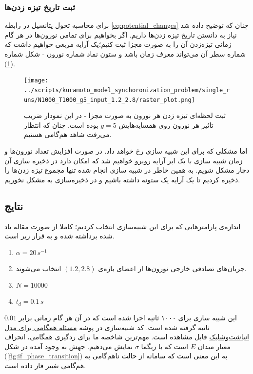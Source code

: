 \documentclass[12pt,onecolumn,a4paper]{article}
\begin{document}
\subsubsection{ثبت تاریخ تیزه زدن‌ها}
برای محاسبه تحول پتانسیل در رابطه \ref{eq:potential_changes} چنان که توضیح داده شد نیاز به دانستن تاریخ تیزه زدن‌ها داریم. اگر بخواهیم برای تمامی نورون‌ها در هر گام زمانی تیزه‌زدن آن را به صورت مجزا ثبت کنیم؛یک آرایه مربعی خواهیم داشت که شماره سطر آن می‌تواند معرف زمان باشد و ستون نماد شماره نورون - شکل شماره (\ref{fig:rasterplot}).\\
\begin{figure}[h]
\centering
  \texttt{[image: ../scripts/kuramoto\_model\_synchoronization\_problem/single\_runs/N1000\_T1000\_g5\_input\_1.2\_2.8/raster\_plot.png]}
 \caption{ثبت لحظه‌ای تیزه زدن هر نورون به صورت مجزا - در این نمودار ضریب تاثیر هر نورون روی همسایه‌هایش $g = 5$ بوده است. چنان که انتظار می‌رفت شاهد هم‌گامی هستیم.}
  \label{fig:rasterplot}
\end{figure}
اما مشکلی که برای این شبیه سازی رخ خواهد داد. در صورت افزایش تعداد نورون‌ها و زمان شبیه سازی با یک ابر آرایه روبرو خواهیم شد که امکان دارد در ذخیره سازی آن دچار مشکل شویم. به همین خاطر در شبیه سازی انجام شده تنها مجموع تیزه زدن‌ها را ذخیره کردیم تا یک آرایه یک ستونه داشته باشیم و در ذخیره‌سازی به مشکل نخوریم.

\subsection{نتایج}
اندازه‌ی پارامتر‌هایی که برای این شبیه‌سازی انتخاب کردیم؛ کاملا از صورت مقاله یاد شده برداشته شده و به قرار زیر است.
\begin{tcolorbox}[colback=green!5!white,colframe=green!75!black]
\begin{enumerate}[*]
\item
$\alpha = 20\, s^{-1}$
\item
جریان‌های تصادفی خارجی نورون‌ها از اعضای بازه‌ی $(1.2,2.8)$ انتخاب می‌شوند.
\item
$N = 10000$
\item
$t_d = 0.1\, s$ 
\end{enumerate}
\end{tcolorbox}
این شبیه سازی برای ۱۰۰۰ ثانیه اجرا شده است که در آن هر گام زمانی برابر $0.01$ ثانیه گرفته شده است. کد شبیه‌سازی در پوشه 
\href{run://..//scripts//kuramoto_model_synchoronization_problem}{مسئله همگامی برای مدل انباشت‌و‌شلیک}
قابل مشاهده است.
مهم‌ترین شاخصه ما برای ردگیری همگامی، انحراف معیار میدان $E$ است که با زیگما $\sigma$ نمایش می‌دهیم. جهش به وجود آمده در شکل‌ (\ref{fig:if_phase_transition}) به این معنی است که سامانه از حالت ناهم‌گامی به هم‌گامی تغییر فاز داده است. 
\end{document}
